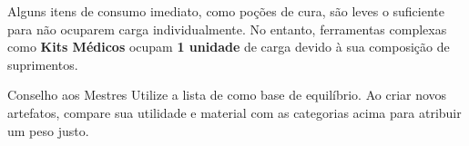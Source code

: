Alguns itens de consumo imediato, como poções de cura, são leves o suficiente para não ocuparem carga individualmente. No entanto, ferramentas complexas como \textbf{Kits Médicos} ocupam \textbf{1 unidade} de carga devido à sua composição de suprimentos.

\begin{rpgboxtips}{Conselho aos Mestres}
Utilize a lista de  como base de equilíbrio. Ao criar novos artefatos, compare sua utilidade e material com as categorias acima para atribuir um peso justo.
\end{rpgboxtips}